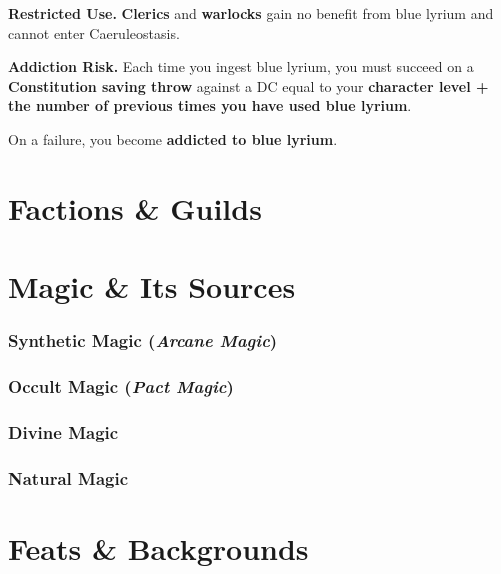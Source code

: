 \documentclass[letterpaper,twocolumn,openany,nodeprecatedcode,breakable,skins,xparse,most]{dndbook}
\begin{document}
\textbf{Restricted Use.}  
\textbf{Clerics} and \textbf{warlocks} gain no benefit from blue lyrium and cannot enter Caeruleostasis.

\textbf{Addiction Risk.}  
Each time you ingest blue lyrium, you must succeed on a \textbf{Constitution saving throw} against a DC equal to your \textbf{character level + the number of previous times you have used blue lyrium}.

On a failure, you become \textbf{addicted to blue lyrium}.

\subsection{}

\subsection{}

\chapter{Factions \& Guilds}



\chapter{Magic \& Its Sources}

\subsection{Synthetic Magic (\textit{Arcane Magic})} 

\subsection{Occult Magic (\textit{Pact Magic})}

\subsection{Divine Magic}

\subsection{Natural Magic}

\chapter{Feats \& Backgrounds}
\end{document}
